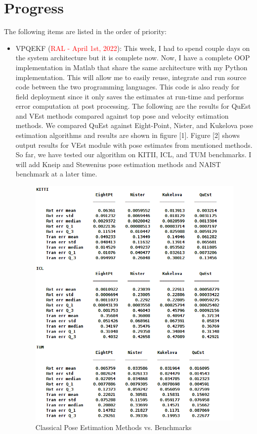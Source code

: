 \documentclass[11pt]{article}
\begin{document}
\section{Progress}
The following items are listed in the order of priority:
\begin{itemize}
    \item VPQEKF (\textcolor{red}{RAL - April 1st, 2022}): This week, I had to
    spend couple days on the system architecture but it is complete now. Now,
    I have a complete OOP implementation in Matlab that share the same
    architecture with my Python implementation. This will allow me to easily
    reuse, integrate and run source code between the two programming languages.
    This code is also ready for field deployment since it only saves the
    estimates at run-time and performs error computation at post processing.
    The following are the results for QuEst and VEst methods compared against
    top pose and velocity estimation methods. We compared QuEst against
    Eight-Point, Nister, and Kukelova pose estimation algorithms and results are
    shown in figure [1]. Figure [2]
    shows output results for VEst module with pose estimates from mentioned
    methods. So far, we have tested our algorithm on KITII, ICL, and TUM
    benchmarks. I will add Kneip and Stewenius pose estimation methods and NAIST
    benchmark at a later time.\

    \begin{figure}
      \begin{center}
      \includegraphics[width=\linewidth]{poses_n_benches.png}
      \caption{Classical Pose Estimation Methods vs. Benchmarks}
      \label{fig:poses_n_benches}
      \end{center}
    \end{figure}


\end{itemize}
\end{document}
